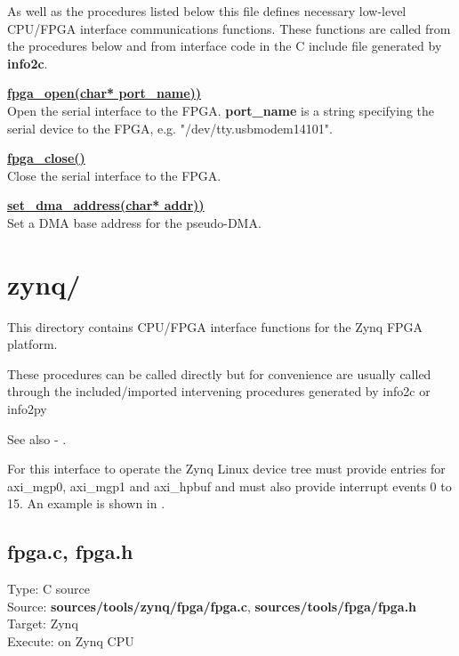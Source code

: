             
            As well as the procedures listed below this file defines necessary
            low-level CPU/FPGA interface communications functions. These
            functions are called from the procedures below and from interface
            code in the C include file generated by {\bf info2c}.
            
            \underline{{\bf  fpga\_open(char* port\_name))}} \\
            Open the serial interface to the FPGA. {\bf port\_name} is a string
            specifying the serial device to the FPGA, e.g.
            "/dev/tty.usbmodem14101".
            
            \underline{{\bf fpga\_close()}} \\
            Close the serial interface to the FPGA.
            
            \underline{{\bf set\_dma\_address(char* addr))}} \\
            Set a DMA base address for the pseudo-DMA.

        
            

    \section{zynq/}
    
        This directory contains CPU/FPGA interface functions for the Zynq FPGA
        platform.
        
        These procedures can be called directly but for convenience are usually
        called through the included/imported intervening procedures generated by
        info2c or info2py
        
        See also - .
    
        For this interface to operate the Zynq Linux device tree must provide
        entries for axi\_mgp0, axi\_mgp1 and axi\_hpbuf and must also provide
        interrupt events 0 to 15. An example is shown in
        .
            
        
        \subsection{fpga.c, fpga.h}\label{ch:tools_c_zynq}

            Type: C source\\        
            Source: {\bf sources/tools/zynq/fpga/fpga.c}, {\bf sources/tools/fpga/fpga.h}\\
            Target: Zynq\\
            Execute: on Zynq CPU

